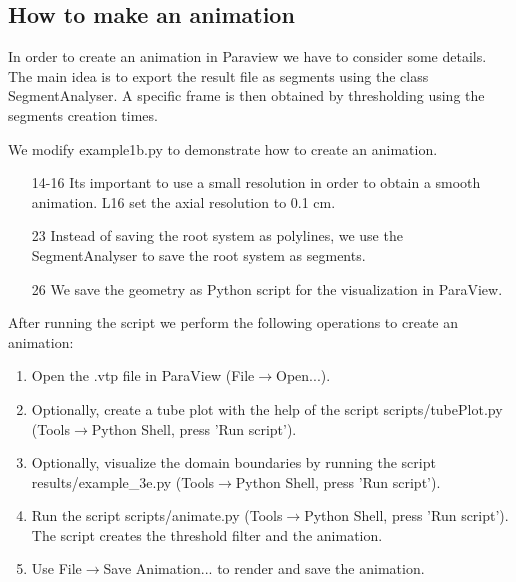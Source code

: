 \documentclass[a4paper]{article}
\begin{document}
\subsection{How to make an animation}

In order to create an animation in Paraview we have to consider some details. 
The main idea is to export the result file as segments using the class SegmentAnalyser. 
A specific frame is then obtained by thresholding using the segments creation times. 

We modify example1b.py to demonstrate how to create an animation.



\begin{itemize}

\item[14-16] Its important to use a small resolution in order to obtain a smooth animation. L16 set the axial resolution to 0.1 cm. 

\item[23] Instead of saving the root system as polylines, we use the SegmentAnalyser to save the root system as segments.

\item[26] We save the geometry as Python script for the visualization in ParaView.

\end{itemize}

After running the script we perform the following operations to create an animation:
\begin{enumerate}
 \item Open the .vtp file in ParaView (File$\rightarrow$Open...).
 \item Optionally, create a tube plot with the help of the script scripts/tubePlot.py (Tools$\rightarrow$Python Shell, press 'Run script').
 \item Optionally, visualize the domain boundaries by running the script results/example\_3e.py (Tools$\rightarrow$Python Shell, press 'Run script').
 \item Run the script scripts/animate.py (Tools$\rightarrow$Python Shell, press 'Run script'). The script creates the threshold filter and the animation. 
 \item Use File$\rightarrow$Save Animation... to render and save the animation.
\end{enumerate}
\end{document}
